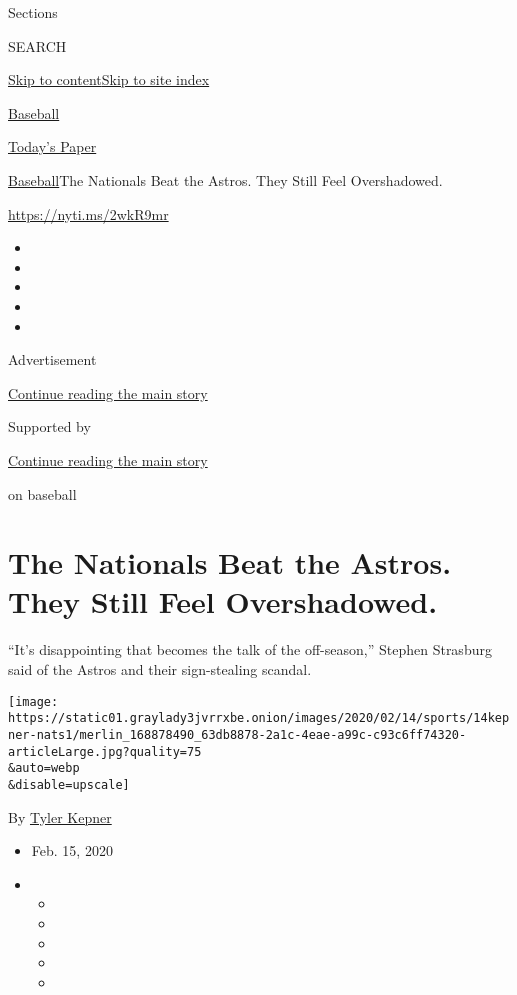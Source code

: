 Sections

SEARCH

\protect\hyperlink{site-content}{Skip to
content}\protect\hyperlink{site-index}{Skip to site index}

\href{https://www.nytimes3xbfgragh.onion/section/sports/baseball}{Baseball}

\href{https://myaccount.nytimes3xbfgragh.onion/auth/login?response_type=cookie\&client_id=vi}{}

\href{https://www.nytimes3xbfgragh.onion/section/todayspaper}{Today's
Paper}

\href{/section/sports/baseball}{Baseball}\textbar{}The Nationals Beat
the Astros. They Still Feel Overshadowed.

\url{https://nyti.ms/2wkR9mr}

\begin{itemize}
\item
\item
\item
\item
\item
\end{itemize}

Advertisement

\protect\hyperlink{after-top}{Continue reading the main story}

Supported by

\protect\hyperlink{after-sponsor}{Continue reading the main story}

on baseball

\hypertarget{the-nationals-beat-the-astros-they-still-feel-overshadowed}{%
\section{The Nationals Beat the Astros. They Still Feel
Overshadowed.}\label{the-nationals-beat-the-astros-they-still-feel-overshadowed}}

``It's disappointing that becomes the talk of the off-season,'' Stephen
Strasburg said of the Astros and their sign-stealing scandal.

\texttt{[image: https://static01.graylady3jvrrxbe.onion/images/2020/02/14/sports/14kepner-nats1/merlin\_168878490\_63db8878-2a1c-4eae-a99c-c93c6ff74320-articleLarge.jpg?quality=75\\\&auto=webp\\\&disable=upscale]}

By \href{https://www.nytimes3xbfgragh.onion/by/tyler-kepner}{Tyler
Kepner}

\begin{itemize}
\item
  Feb. 15, 2020
\item
  \begin{itemize}
  \item
  \item
  \item
  \item
  \item
  \end{itemize}
\end{itemize}

